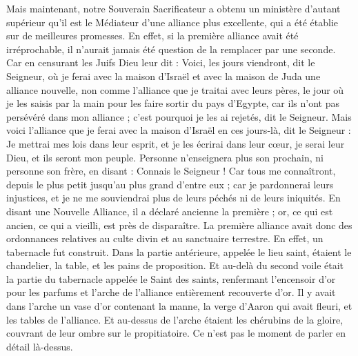 \begin{multicols}{2}
Mais maintenant, notre Souverain Sacrificateur a obtenu un ministère d'autant supérieur qu'il est le Médiateur d'une alliance plus excellente, qui a été établie sur de meilleures promesses.
En effet, si la première alliance avait été irréprochable, il n’aurait jamais été question de la remplacer par une seconde.
Car en censurant les Juifs Dieu leur dit : Voici, les jours viendront, dit le Seigneur, où je ferai avec la maison d'Israël et avec la maison de Juda une alliance nouvelle,
non comme l'alliance que je traitai avec leurs pères, le jour où je les saisis par la main pour les faire sortir du pays d'Egypte, car ils n'ont pas persévéré dans mon alliance ; c'est pourquoi je les ai rejetés, dit le Seigneur.
Mais voici l'alliance que je ferai avec la maison d'Israël en ces jours-là, dit le Seigneur : Je mettrai mes lois dans leur esprit, et je les écrirai dans leur cœur, je serai leur Dieu, et ils seront mon peuple.
Personne n'enseignera plus son prochain, ni personne son frère, en disant : Connais le Seigneur ! Car tous me connaîtront, depuis le plus petit jusqu'au plus grand d'entre eux ;
car je pardonnerai leurs injustices, et je ne me souviendrai plus de leurs péchés ni de leurs iniquités.
En disant une Nouvelle Alliance, il a déclaré ancienne la première ; or, ce qui est ancien, ce qui a vieilli, est près de disparaître.
\VerseOne{}La première alliance avait donc des ordonnances relatives au culte divin et au sanctuaire terrestre.
En effet, un tabernacle fut construit. Dans la partie antérieure, appelée le lieu saint, étaient le chandelier, la table, et les pains de proposition.
Et au-delà du second voile était la partie du tabernacle appelée le Saint des saints,
renfermant l’encensoir d'or pour les parfums et l'arche de l'alliance entièrement recouverte d'or. Il y avait dans l’arche un vase d'or contenant la manne, la verge d'Aaron qui avait fleuri, et les tables de l'alliance.
Et au-dessus de l'arche étaient les chérubins de la gloire, couvrant de leur ombre sur le propitiatoire. Ce n’est pas le moment de parler en détail là-dessus.

\end{multicols}
